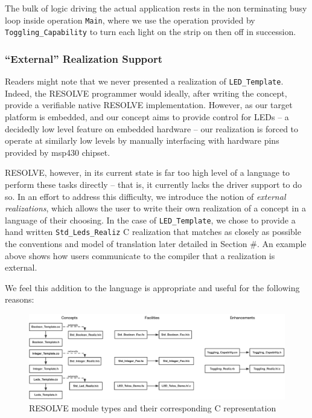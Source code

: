 \documentclass{sig-alternate}
\begin{document}
The bulk of logic driving the actual application rests in the non terminating busy loop inside operation \texttt{Main}, where we use the operation provided by \texttt{Toggling\_Capability} to turn each light on the strip on then off in succession.

\subsubsection{``External'' Realization Support}
\label{ssec:external}

Readers might note that we never presented a realization of \texttt{LED\_Template}. Indeed, the RESOLVE programmer would ideally, after writing the concept, provide a verifiable native RESOLVE implementation. However, as our target platform is embedded, and our concept aims to provide control for LEDs -- a decidedly low level feature on embedded hardware -- our realization is forced to operate at similarly low levels by manually interfacing with hardware pins provided by msp430 chipset. 

RESOLVE, however, in its current state is far too high level of a language to perform these tasks directly -- that is, it currently lacks the driver support to do so. In an effort to address this difficulty, we introduce the notion of \textit{external realizations}, which allows the user to write their own realization of a concept in a language of their choosing. In the case of \texttt{LED\_Template}, we chose to provide a hand written \texttt{Std\_Leds\_Realiz} C realization that matches as closely as possible the conventions and model of translation later detailed in Section \#. An example above shows how users communicate to the compiler that a realization is external. 



We feel this addition to the language is appropriate and useful for the following reasons:





\begin{figure}[!htb]
\centering
\includegraphics[scale=.45]{figs/implementation.pdf}
\caption{RESOLVE module types and their corresponding C representation}
\end{figure}
\label{fig:imp}
\end{document}
